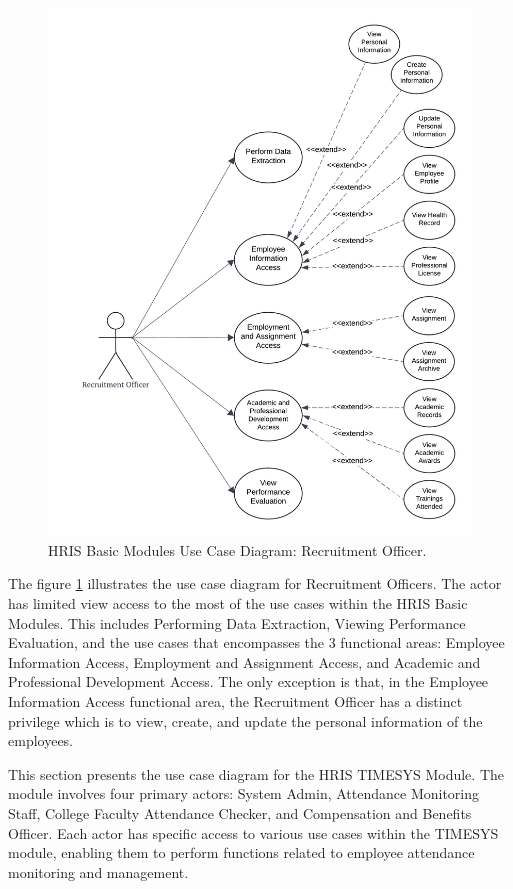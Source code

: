     \begin{figure}[H]
        \centering
        \includegraphics[width=0.9\linewidth]{figures/images/use-case-basic-8.png}
        \caption{HRIS Basic Modules Use Case Diagram: Recruitment Officer.}
        \label{fig:use-case-basic-8}
    \end{figure}

    The figure \ref{fig:use-case-basic-8} illustrates the use case diagram for Recruitment Officers. The actor has limited view access to the most of the use cases within the HRIS Basic Modules. This includes Performing Data Extraction, Viewing Performance Evaluation, and the use cases that  encompasses the 3 functional areas: Employee Information Access, Employment and Assignment Access, and Academic and Professional Development Access. The only exception is that,  in the Employee Information Access functional area, the Recruitment Officer has a distinct privilege which is to view, create, and update the personal information of the employees.


    This section presents the use case diagram for the HRIS TIMESYS Module. The module involves four primary actors: System Admin, Attendance Monitoring Staff, College Faculty Attendance Checker, and Compensation and Benefits Officer. Each actor has specific access to various use cases within the TIMESYS module, enabling them to perform functions related to employee attendance monitoring and management.

